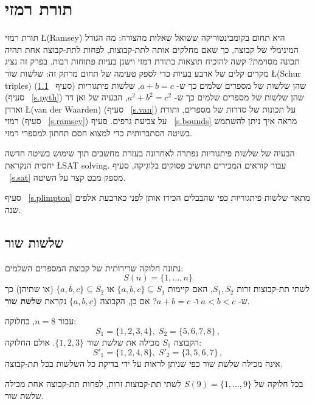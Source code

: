 

\chapter%
{תורת רמזי}%
\label{c.ramsey}

תורת רמזי
\L{(Ramsey)}
היא תחום בקומבינטוריקה ששואל שאלות מהצורה: מה הגודל המינימלי של קבוצה, כך שאם מחלקים אותה לתת-קבוצות, לפחות לתת-קבוצה אחת תהיה תכונה מסוימת? קשה להוכיח תוצאות בתורת רמזי
וישנן בעיות פתוחות רבות. בפרק זה נציג מקרים קלים של ארבע בעיות כדי לספק טעימה של תחום מרתק זה: שלשות שור
\L{(Schur triples)}
(סעיף%
~\ref{s.schur})
שהן שלשות של מספרים שלמים כך ש-%
$a+b=c$,
שלשות פיתגוריות
(סעיף%
~\ref{s.pyth})
שהן שלשות של מספרים שלמים כך ש-%
$a^2+b^2=c^2$,
הבעיה של ואן דר וארדן
\L{(van der Waarden)}
(סעיף%
~\ref{s.van})
על תכונות של סדרות של מספרים, ותורת רמזי
(סעיף%
~\ref{s.ramsey})
על צביעת גרפים. סעיף%
~\ref{s.bounds}
מראה איך ניתן להשתמש בשיטה הסתברותית כדי למצוא חסם תחתון למספרי רמזי.


הבעיה של שלשות פיתגוריות
נפתרה לאחרונה בעזרת מחשבים תוך שימוש בשיטה חדשה יחסית הנקראת 
\L{SAT solving}.
עבור קוראים המכירים תחשיב פסוקים בלוגיקה, סעיף%
~\ref{s.sat}
מספק מבט קצר על השיטה.

סעיף%
~\ref{s.plimpton}
מתאר שלשות פיתגוריות 
כפי שהבבלים הכירו אותן לפני כארבעת אלפים שנה.


\section{שלשות שור}\label{s.schur}

\begin{definition}
נתונה חלוקה שרירותית של קבוצת המספרים השלמים:
\[
S(n)=\{1,\ldots,n\}
\]
לשתי תת-קבוצות זרות
$S_1,S_2$,
האם קיימות
$\{a,b,c\}\subseteq S_1$
או
$\{a,b,c\}\subseteq S_2$
(או שתיהן) כך ש-%
$a\!<\!b\!<\!c$
ו-%
$a+b=c$?
אם כן, הקבוצה 
$\{a,b,c\}$
נקראת 
\textbf{שלשת שור}.
\end{definition}

\begin{example}
עבור
$n=8$,
בחלוקה:
\begin{equation}
S_1 = \{1,2,3,4\},\; S_2 = \{5,6,7,8\}\,,
\label{eq.schur0}
\end{equation}
הקבוצה
$S_1$
מכילה את שלשת שור
$\{1,2,3\}$.
אולם החלוקה:
\begin{equation}
S'_1 = \{1,2,4,8\},\; S'_2 = \{3,5,6,7\}\,,
\label{eq:schur1}
\end{equation}
אינה מכילה שלשת שור
כפי שניתן לראות על ידי בדיקת כל השלשות בכל תת-קבוצה.
\end{example}
\begin{theorem}
בכל חלוקה של
$S(9)=\{1,\ldots,9\}$
לשתי תת-קבוצות זרות, לפחות תת-קבוצה אחת מכילה שלשת שור.
\end{theorem}

